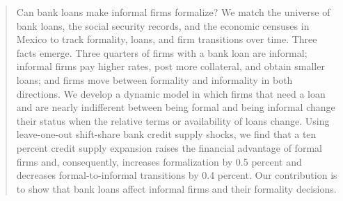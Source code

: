 \documentclass[12pt]{article}
\begin{document}
\begin{abstract}
Can bank loans make informal firms formalize? We match the universe of bank loans, the social security records, and the economic censuses in Mexico to track formality, loans, and firm transitions over time. Three facts emerge. Three quarters of firms with a bank loan are informal; informal firms pay higher rates, post more collateral, and obtain smaller loans; and firms move between formality and informality in both directions. We develop a dynamic model in which firms that need a loan and are nearly indifferent between being formal and being informal change their status when the relative terms or availability of loans change. Using leave-one-out shift-share bank credit supply shocks, we find that a ten percent credit supply expansion raises the financial advantage of formal firms and, consequently, increases formalization by 0.5 percent and decreases formal-to-informal transitions by 0.4 percent. Our contribution is to show that bank loans affect informal firms and their formality decisions.
\end{abstract}
\end{document}
